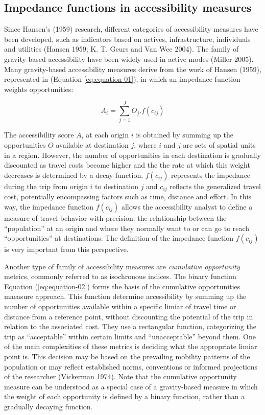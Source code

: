 \documentclass[preprint, 3p,
authoryear]{elsarticle} %
\begin{document}
\hypertarget{impedance-functions-in-accessibility-measures}{%
\subsection{Impedance functions in accessibility
measures}\label{impedance-functions-in-accessibility-measures}}

Since Hansen's (1959) research, different categories of accessibility
measures have been developed, such as indicators based on actives,
infrastructure, individuals and utilities (Hansen 1959; K. T. Geurs and
Van Wee 2004). The family of gravity-based accessibility have been
widely used in active modes (Miller 2005). Many gravity-based
accessibility measures derive from the work of Hansen (1959),
represented in (Equation \ref{eq:equation-01}), in which an impedance
function weights opportunities:

\begin{equation}
A_{i} = \sum_{j=1}^J O_j .f(c_{ij})
\label{eq:equation-01}
\end{equation}

The accessibility score \(A_{i}\) at each origin \(i\) is obtained by
summing up the opportunities \(O\) available at destination \(j\), where
\(i\) and \(j\) are sets of spatial units in a region. However, the
number of opportunities in each destination is gradually discounted as
travel costs become higher and the the rate at which this weight
decreases is determined by a decay function. \(f(c_{ij})\) represents
the impedance during the trip from origin \(i\) to destination \(j\) and
\(c_{ij}\) reflects the generalized travel cost, potentially
encompassing factors such as time, distance and effort. In this way, the
impedance function \(f(c_{ij})\) allows the accessibility analyst to
define a measure of travel behavior with precision: the relationship
between the ``population'' at an origin and where they normally want to
or can go to reach ``opportunities'' at destinations. The definition of
the impedance function \(f(c_{ij})\) is very important from this
perspective.

Another type of family of accessibility measures are \emph{cumulative
opportunity} metrics, commonly referred to as isochronous indices. The
binary function Equation (\ref{eq:equation-02}) forms the basis of the
cumulative opportunities maeasure approach. This function determine
accessibility by summing up the number of opportunities available within
a specific limiar of travel time or distance from a reference point,
without discounting the potential of the trip in relation to the
associated cost. They use a rectangular function, categorizing the trip
as ``acceptable'' within certain limits and ``unacceptable'' beyond
them. One of the main complexities of these metrics is deciding what the
appropriate limiar point is. This decision may be based on the
prevailing mobility patterns of the population or may reflect
established norms, conventions or informed projections of the researcher
(Vickerman 1974). Note that the cumulative opportunity measure can be
understood as a special case of a gravity-based measure in which the
weight of each opportunity is defined by a binary function, rather than
a gradually decaying function.
\end{document}
